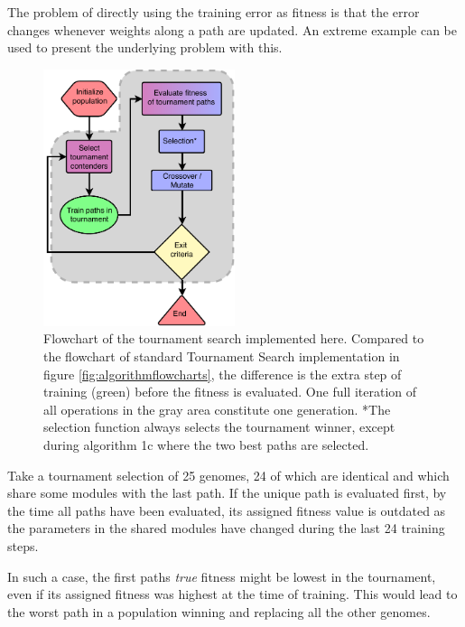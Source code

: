 The problem of directly using the training error as fitness is that the error changes whenever weights along a path are updated. An extreme example can be used to present the underlying problem with this.

\begin{figure}[ht]
    \centering
    \includegraphics[width=0.5\textwidth]{Chapters/4.Experiments/exp2/figures/TS_implementation.pdf}
    \caption[Tournament search flowchart]{Flowchart of the tournament search implemented here. Compared to the flowchart of standard Tournament Search implementation in figure \ref{fig:algorithmflowcharts}, the difference is the extra step of training (green) before the fitness is evaluated. One full iteration of all operations in the gray area constitute one generation. *The selection function always selects the tournament winner, except during algorithm 1c where the two best paths are selected.}
    \label{fig:ts_flowchart}
\end{figure}

Take a tournament selection of 25 genomes, 24 of which are identical and which share some modules with the last path. If the unique path is evaluated first, by the time all paths have been evaluated, its assigned fitness value is outdated as the parameters in the shared modules have changed during the last 24 training steps.

In such a case, the first paths \emph{true} fitness might be lowest in the tournament, even if its assigned fitness was highest at the time of training. This would lead to the worst path in a population winning and replacing all the other genomes. 

